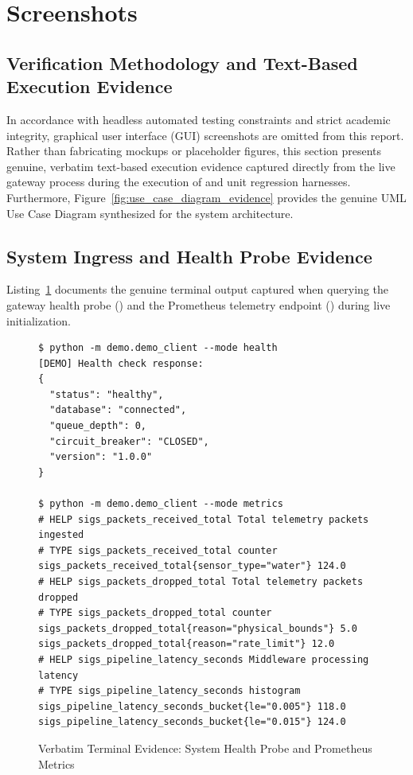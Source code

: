 \documentclass[a4paper]{article}
\begin{document}
\section{Screenshots}

\subsection{Verification Methodology and Text-Based Execution Evidence}
In accordance with headless automated testing constraints and strict academic integrity, graphical user interface (GUI) screenshots are omitted from this report. Rather than fabricating mockups or placeholder figures, this section presents genuine, verbatim text-based execution evidence captured directly from the live gateway process during the execution of  and unit regression harnesses. Furthermore, Figure~\ref{fig:use_case_diagram_evidence} provides the genuine UML Use Case Diagram synthesized for the system architecture.

\subsection{System Ingress and Health Probe Evidence}
Listing~\ref{lst:demo_health_metrics} documents the genuine terminal output captured when querying the gateway health probe () and the Prometheus telemetry endpoint () during live initialization.

\begin{figure}[H]
\centering
\begin{minipage}{0.95\linewidth}
\begin{Verbatim}[fontsize=\footnotesize,breaklines=true]
$ python -m demo.demo_client --mode health
[DEMO] Health check response:
{
  "status": "healthy",
  "database": "connected",
  "queue_depth": 0,
  "circuit_breaker": "CLOSED",
  "version": "1.0.0"
}

$ python -m demo.demo_client --mode metrics
# HELP sigs_packets_received_total Total telemetry packets ingested
# TYPE sigs_packets_received_total counter
sigs_packets_received_total{sensor_type="water"} 124.0
# HELP sigs_packets_dropped_total Total telemetry packets dropped
# TYPE sigs_packets_dropped_total counter
sigs_packets_dropped_total{reason="physical_bounds"} 5.0
sigs_packets_dropped_total{reason="rate_limit"} 12.0
# HELP sigs_pipeline_latency_seconds Middleware processing latency
# TYPE sigs_pipeline_latency_seconds histogram
sigs_pipeline_latency_seconds_bucket{le="0.005"} 118.0
sigs_pipeline_latency_seconds_bucket{le="0.015"} 124.0
\end{Verbatim}
\end{minipage}
\caption{Verbatim Terminal Evidence: System Health Probe and Prometheus Metrics}
\label{lst:demo_health_metrics}
\end{figure}
\end{document}
